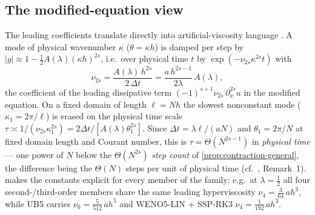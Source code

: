 \documentclass[pdflatex,sn-mathphys-num]{sn-jnl}%
\theoremstyle{thmstyleone}%
\theoremstyle{thmstyletwo}%
\theoremstyle{thmstylethree}%
\begin{document}
\subsection{The modified-equation view}\label{sec:modified-eq}

The leading coefficients translate directly into artificial-viscosity language \cite{WarmingHyett1974,MargolinRider2002}.
A mode of physical wavenumber $\kappa$ ($\theta=\kappa h$) is damped per step by $|g|\approx1-\tfrac12A(\lambda)(\kappa h)^{2s}$, i.e.\ over physical time $t$ by $\exp(-\nu_{2s}\kappa^{2s}t)$ with \[ \nu_{2s} = \frac{A(\lambda)\,h^{2s}}{2\,\Delta t} = \frac{a\,h^{2s-1}}{2\lambda}\,A(\lambda), \] the coefficient of the leading dissipative term $(-1)^{s+1}\nu_{2s}\,\partial_x^{2s}u$ in the modified equation.
On a fixed domain of length $\ell=Nh$ the slowest nonconstant mode ($\kappa_1=2\pi/\ell$) is erased on the physical time scale $\tau\asymp1/(\nu_{2s}\kappa_1^{2s})=2\Delta t/[A(\lambda)\theta_1^{2s}]$.
Since $\Delta t=\lambda\ell/(aN)$ and $\theta_1=2\pi/N$ at fixed domain length and Courant number, this is $\tau=\Theta(N^{2s-1})$ in \emph{physical time} --- one power of $N$ below the $\Theta(N^{2s})$ \emph{step count} of \cref{prop:contraction-general}, the difference being the $\Theta(N)$ steps per unit of physical time (cf.\ \cite{PolemitisChristakisDrikakis2026FVerasure}, Remark~1).
 makes the constants explicit for every member of the family: e.g.\ at $\lambda=\tfrac12$ all four second-/third-order members share the same leading hyperviscosity $\nu_4=\tfrac{3}{64}\,ah^3$, while UB5 carries $\nu_6=\tfrac{5}{512}\,ah^5$ and WENO5-LIN + SSP-RK3 $\nu_4=\tfrac1{192}\,ah^3$.
\end{document}
